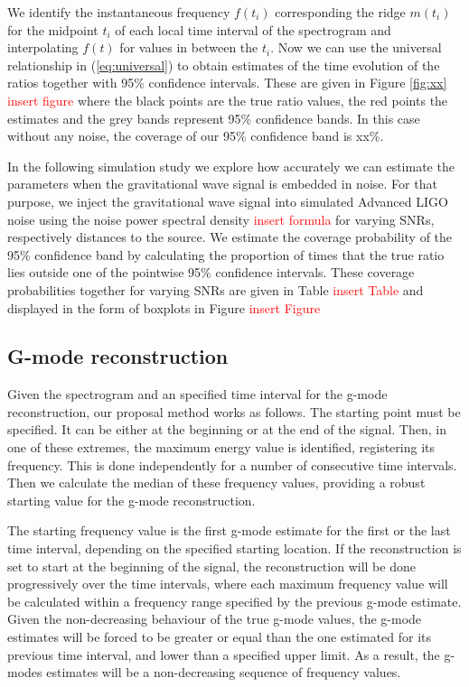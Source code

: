 We identify the instantaneous frequency $f(t_i)$ corresponding the  ridge $m(t_i)$ for the midpoint $t_i$ of each local time interval of the spectrogram and interpolating $f(t)$
for values in between the $t_i$. Now we can use the universal relationship in (\ref{eq:universal}) to obtain estimates of the time evolution of the
ratios together with 95\% confidence intervals. These are given in Figure \ref{fig:xx} \textcolor{red}{insert figure} where the black points are the true ratio values, the red points the
estimates and the grey bands represent 95\% confidence bands. In this case without any noise, the coverage of our 95\% confidence band is xx\%.

In the following simulation study we explore how accurately we can estimate the parameters when the gravitational wave signal is embedded in noise.
For that purpose, we inject the gravitational wave signal into  simulated Advanced LIGO noise using the noise power spectral density \textcolor{red}{insert formula} for varying
SNRs, respectively distances to the source. We estimate the coverage probability of the 95\% confidence band by calculating the proportion of times that the true ratio lies outside one of the pointwise 95\% confidence intervals.
These coverage probabilities together for varying SNRs are given in Table \textcolor{red}{insert Table} and displayed in the form of boxplots in Figure \textcolor{red}{insert Figure}


\subsection{G-mode reconstruction}

Given the spectrogram and an specified time interval for the g-mode reconstruction, our proposal method works as follows.  The starting point must be specified.  It can be either at the beginning or at the end of the signal.  Then, in one of these extremes, the maximum energy value is identified, registering its frequency.  This is done independently for a number of consecutive time intervals.  Then we calculate the median of these frequency values, providing a robust starting value for the g-mode reconstruction.

The starting frequency value is the first g-mode estimate for the first or the last time interval, depending on the specified starting location.  If the reconstruction is set to start at the beginning of the signal, the reconstruction will be done progressively over the time intervals, where each maximum frequency value will be calculated within a frequency range specified by the previous g-mode estimate.  Given the non-decreasing behaviour of the true g-mode values, the g-mode estimates will be forced to be greater or equal than the one estimated for its previous time interval, and lower than a specified upper limit.  As a result, the g-modes estimates will be a non-decreasing sequence of frequency values. 

